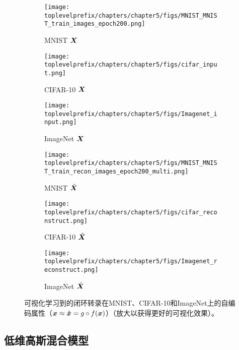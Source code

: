 \documentclass[../../book-main.tex]{subfiles}
\begin{document}
\begin{figure}[t]
    \begin{subfigure}[t]{0.3\textwidth}
        \centering
        \texttt{[image: \\toplevelprefix/chapters/chapter5/figs/MNIST\_MNIST\_train\_images\_epoch200.png]}
        \caption{{\small MNIST $\bm{X}$}}
    \end{subfigure}
    \hfill
    \begin{subfigure}[t]{0.3\textwidth}
        \centering
        \texttt{[image: \\toplevelprefix/chapters/chapter5/figs/cifar\_input.png]}
        \caption{{\small CIFAR-10 $\bm{X}$}}
    \end{subfigure}
    \hfill
    \begin{subfigure}[t]{0.3\textwidth}
        \centering
        \texttt{[image: \\toplevelprefix/chapters/chapter5/figs/Imagenet\_input.png]}
        \caption{{\small ImageNet $\bm{X}$}}
    \end{subfigure}

    \begin{subfigure}[t]{0.3\textwidth}
        \centering
        \texttt{[image: \\toplevelprefix/chapters/chapter5/figs/MNIST\_MNIST\_train\_recon\_images\_epoch200\_multi.png]}
        \caption{{\small MNIST $\hat{\bm{X}}$}}
    \end{subfigure}
    \hfill
    \begin{subfigure}[t]{0.3\textwidth}
        \centering
        \texttt{[image: \\toplevelprefix/chapters/chapter5/figs/cifar\_reconstruct.png]}
        \caption{{\small CIFAR-10 $\hat{\bm{X}}$}}
    \end{subfigure}
    \hfill
    \begin{subfigure}[t]{0.3\textwidth}
        \centering
        \texttt{[image: \\toplevelprefix/chapters/chapter5/figs/Imagenet\_reconstruct.png]}
        \caption{{\small ImageNet $\hat{\bm{X}}$}}
    \end{subfigure}
    \caption{可视化学习到的闭环转录在MNIST、CIFAR-10和ImageNet上的自编码属性（$\bm{x} \approx \hat{\bm{x}} = g\circ f(\bm{x})$）（放大以获得更好的可视化效果）。}
    \label{fig:justify_xhat_equals_x}
\end{figure}

\subsection{低维高斯混合模型}
\end{document}
